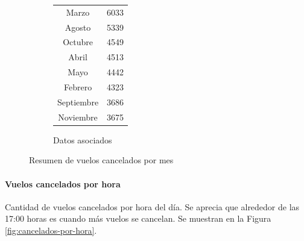 \documentclass[12pt]{article}
\numberwithin{equation}{section}
\numberwithin{table}{section}
\numberwithin{figure}{section}
\begin{document}
\begin{figure}
\begin{subfigure}[b]{0.3\textwidth}
\begin{tabular}{@{}cc@{}}
Marzo        & 6033              \\
Agosto       & 5339              \\
Octubre      & 4549              \\
Abril        & 4513              \\
Mayo         & 4442              \\
Febrero      & 4323              \\
Septiembre   & 3686              \\
Noviembre    & 3675              \\ \bottomrule
\end{tabular}
                \caption{Datos asociados}
        \end{subfigure}
        \caption{Resumen de vuelos cancelados por mes}
        \label{fig:cancelados-por-mes}
\end{figure}

\paragraph{Vuelos cancelados por hora}
Cantidad de vuelos cancelados por hora del día.
Se aprecia que alrededor de las 17:00 horas es cuando más vuelos se cancelan.
Se muestran en la Figura \ref{fig:cancelados-por-hora}.
\end{document}
